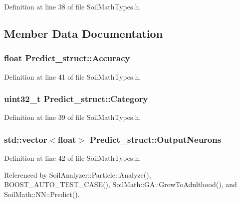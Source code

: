Definition at line 38 of file Soil\+Math\+Types.\+h.



\subsection{Member Data Documentation}
\hypertarget{struct_predict__struct_a587f18ac05cd65437327a54261d1e22c}{}
\subsubsection[{Accuracy}]{\setlength{\rightskip}{0pt plus 5cm}float Predict\+\_\+struct\+::\+Accuracy}\label{struct_predict__struct_a587f18ac05cd65437327a54261d1e22c}


Definition at line 41 of file Soil\+Math\+Types.\+h.

\hypertarget{struct_predict__struct_a9ec8092acf251221ad920454472f734b}{}
\subsubsection[{Category}]{\setlength{\rightskip}{0pt plus 5cm}uint32\+\_\+t Predict\+\_\+struct\+::\+Category}\label{struct_predict__struct_a9ec8092acf251221ad920454472f734b}


Definition at line 39 of file Soil\+Math\+Types.\+h.

\hypertarget{struct_predict__struct_aa0708cae93baa061f21452537e86d3bd}{}
\subsubsection[{Output\+Neurons}]{\setlength{\rightskip}{0pt plus 5cm}std\+::vector$<$float$>$ Predict\+\_\+struct\+::\+Output\+Neurons}\label{struct_predict__struct_aa0708cae93baa061f21452537e86d3bd}


Definition at line 42 of file Soil\+Math\+Types.\+h.



Referenced by Soil\+Analyzer\+::\+Particle\+::\+Analyze(), B\+O\+O\+S\+T\+\_\+\+A\+U\+T\+O\+\_\+\+T\+E\+S\+T\+\_\+\+C\+A\+S\+E(), Soil\+Math\+::\+G\+A\+::\+Grow\+To\+Adulthood(), and Soil\+Math\+::\+N\+N\+::\+Predict().


